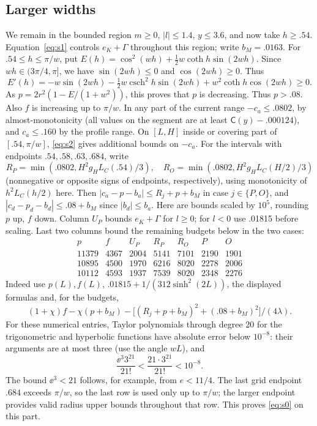 \subsection{Larger widths}\label{subsec:segments-large}

We remain in the bounded region $m\ge0$, $|l|\le1.4$, $y\le3.6$, and now take $h\ge.54$. Equation~\eqref{eq:s1} controls $e_K+\Gamma$ throughout this region; write $b_M=.0163$. For $.54\le h\le\pi/w$, put $E(h)=\cos^2(wh)+\tfrac12w\coth h\sin(2wh)$. Since $wh\in(3\pi/4,\pi]$, we have $\sin(2wh)\le0$ and $\cos(2wh)\ge0$. Thus
\[
 E'(h)=-w\sin(2wh)-\tfrac12w\operatorname{csch}^2h\sin(2wh)
          +w^2\coth h\cos(2wh)\ge0.
\]
As $p=2r^2(1-E/(1+w^2))$, this proves that $p$ is decreasing. Thus $p>.08$. Also $f$ is increasing up to $\pi/w$. In any part of the current range $-c_a\le .0802$, by almost-monotonicity (all values on the segment are at least $\mathsf C(y)-.000124$), and $c_a\le .160$ by the profile range. On $[L,H]$ inside or covering part of $[.54,\pi/w]$, \eqref{eq:s2} gives additional bounds on $-c_a$. For the intervals with endpoints $.54,.58,.63,.684$, write
\[
 R_P=\min(.0802, H^2 g_H L_C(.54)/3),\quad R_O=\min(.0802,H^2 g_H L_C(H/2)/3)
\]
(nonnegative or opposite signs of endpoints, respectively), using monotonicity of $h^2L_C(h/2)$ here. Then $|c_a-p-b_a|\le R_j+p+b_M$ in case $j\in\{P,O\}$, and $|c_d-p_d-b_d|\le .08+b_M$ since $|b_d|\le b_a$. Here are bounds scaled by $10^5$, rounding $p$ up, $f$ down. Column $U_P$ bounds $e_K+\Gamma$ for $l\ge0$; for $l<0$ use .01815 before scaling. Last two columns bound the remaining budgets below in the two cases:
\[
\begin{array}{rrrrrrr}
 p& f&U_P&R_P&R_O& P&O\\\hline
11379&4367&2004&5141&7101&2190&1901\\
10895&4500&1970&6216&8020&2278&2006\\
10112&4593&1937&7539&8020&2348&2276
\end{array}
\]
Indeed use $p(L),f(L)$, $.01815+1/(312\sinh^2(2L))$, the displayed formulas and, for the budgets,
\[
 (1+\chi)f-\chi(p+b_M)-\big[(R_j+p+b_M)^2+(.08+b_M)^2\big]/(4\lambda).
\]
For these numerical entries, Taylor polynomials through degree 20 for the trigonometric and hyperbolic functions have absolute error below $10^{-8}$: their arguments are at most three (use the angle $wL$), and
\[
 \frac{\ee^3 3^{21}}{21!}<\frac{21\cdot3^{21}}{21!}<10^{-8}.
\]
The bound $\ee^3<21$ follows, for example, from $e<11/4$. The last grid endpoint $.684$ exceeds $\pi/w$, so the last row is used only up to $\pi/w$; the larger endpoint provides valid radius upper bounds throughout that row. This proves \eqref{eq:s0} on this part.

